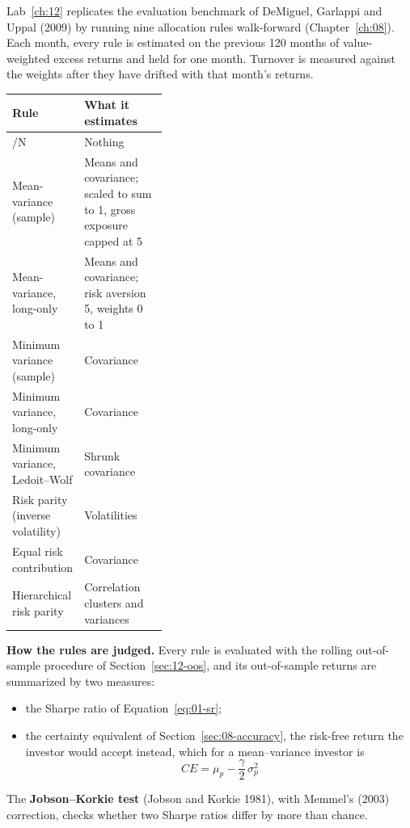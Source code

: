 Lab~\ref{ch:12} replicates the evaluation benchmark of DeMiguel, Garlappi and Uppal (2009) by running nine allocation rules walk-forward (Chapter~\ref{ch:08}). Each month, every rule is estimated on the previous 120 months of value-weighted excess returns and held for one month. Turnover is measured against the weights after they have drifted with that month's returns.

\begin{center}
\small
\begin{tabularx}{0.9\linewidth}{@{}>{\raggedright\arraybackslash}p{0.38\linewidth}>{\raggedright\arraybackslash}X@{}}
\toprule
Rule & What it estimates \\
\midrule
1/N & Nothing \\
Mean-variance (sample) & Means and covariance; scaled to sum to 1, gross exposure capped at 5 \\
Mean-variance, long-only & Means and covariance; risk aversion 5, weights 0 to 1 \\
Minimum variance (sample) & Covariance \\
Minimum variance, long-only & Covariance \\
Minimum variance, Ledoit--Wolf & Shrunk covariance \\
Risk parity (inverse volatility) & Volatilities \\
Equal risk contribution & Covariance \\
Hierarchical risk parity & Correlation clusters and variances \\
\bottomrule
\end{tabularx}
\end{center}

\textbf{How the rules are judged.} Every rule is evaluated with the rolling out-of-sample procedure of Section~\ref{sec:12-oos}, and its out-of-sample returns are summarized by two measures:
\begin{itemize}
  \item the Sharpe ratio of Equation~\eqref{eq:01-sr};
  \item the certainty equivalent of Section~\ref{sec:08-accuracy}, the risk-free return the investor would accept instead, which for a mean--variance investor is
  \begin{equation}
    CE = \mu_p - \frac{\gamma}{2}\,\sigma_p^2
    \label{eq:12-ce}
  \end{equation}
\end{itemize}

The \textbf{Jobson--Korkie test} (Jobson and Korkie 1981), with Memmel's (2003) correction, checks whether two Sharpe ratios differ by more than chance.

